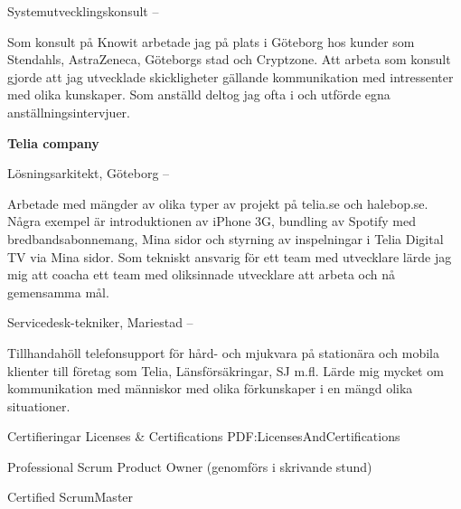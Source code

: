 \documentclass[letterpaper,MMMyyyy,nonstopmode]{resume}
\begin{document}
\begin{Body}
\Gap
\BulletItem
Systemutvecklingskonsult
\hfill
{} --

\begin{Detail}
\SubBulletItem
Som konsult på Knowit arbetade jag på plats i Göteborg hos kunder som Stendahls, AstraZeneca, Göteborgs stad och Cryptzone. Att arbeta som konsult gjorde att jag utvecklade skickligheter gällande kommunikation med intressenter med olika kunskaper. Som anställd deltog jag ofta i och utförde egna anställningsintervjuer.
\end{Detail}

\BigGap
\Entry
\textbf{Telia company}

\Gap
\BulletItem
Lösningsarkitekt, Göteborg
\hfill
{} --

\begin{Detail}
\SubBulletItem
Arbetade med mängder av olika typer av projekt på telia.se och halebop.se. Några exempel är introduktionen av iPhone 3G, bundling av Spotify med bredbandsabonnemang, Mina sidor och styrning av inspelningar i Telia Digital TV via Mina sidor. Som tekniskt ansvarig för ett team med utvecklare lärde jag mig att coacha ett team med oliksinnade utvecklare att arbeta och nå gemensamma mål.
\end{Detail}

\Gap
\BulletItem
Servicedesk-tekniker, Mariestad
\hfill
{} --

\begin{Detail}
\SubBulletItem
Tillhandahöll telefonsupport för hård- och mjukvara på stationära och mobila klienter till företag som Telia, Länsförsäkringar, SJ m.fl. Lärde mig mycket om kommunikation med människor med olika förkunskaper i en mängd olika situationer.
\end{Detail}



\Section
{Certifieringar}
{Licenses \& Certifications}
{PDF:LicensesAndCertifications}

\BulletItem
Professional Scrum Product Owner (genomförs i skrivande stund)
\hfill
{}

\BulletItem
Certified ScrumMaster
\hfill
{}

\newpage



\end{Body}
\end{document}
